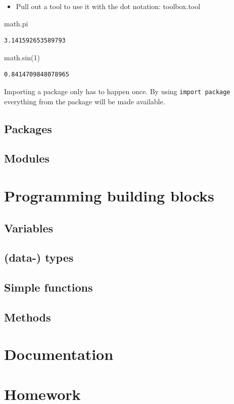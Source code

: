 \documentclass[
  letterpaper,
  DIV=11,
  numbers=noendperiod]{scrartcl}
\newenvironment{Shaded}{\begin{snugshade}}{\end{snugshade}}
\newcommand{\DecValTok}[1]{\textcolor[rgb]{0.68,0.00,0.00}{#1}}
\newcommand{\NormalTok}[1]{\textcolor[rgb]{0.00,0.23,0.31}{#1}}
\providecommand{\tightlist}{%
  \setlength{\itemsep}{0pt}\setlength{\parskip}{0pt}}\usepackage{longtable,booktabs,array}
\begin{document}
\begin{itemize}
\tightlist
\item
  Pull out a tool to use it with the dot notation: {toolbox}{.}{tool}
\end{itemize}

\begin{Shaded}
\begin{Highlighting}[]
\NormalTok{math.pi}
\end{Highlighting}
\end{Shaded}

\begin{verbatim}
3.141592653589793
\end{verbatim}

\begin{Shaded}
\begin{Highlighting}[]
\NormalTok{math.sin(}\DecValTok{1}\NormalTok{)}
\end{Highlighting}
\end{Shaded}

\begin{verbatim}
0.8414709848078965
\end{verbatim}

Importing a package only has to happen once. By using
\texttt{import\ package} everything from the package will be made
available.

\subsection{Packages}\label{packages}

\subsection{Modules}\label{modules}

\section{Programming building blocks}\label{programming-building-blocks}

\subsection{Variables}\label{variables}

\subsection{(data-) types}\label{data--types}

\subsection{Simple functions}\label{simple-functions}

\subsection{Methods}\label{methods}

\section{Documentation}\label{documentation}

\section{Homework}\label{homework}
\end{document}
